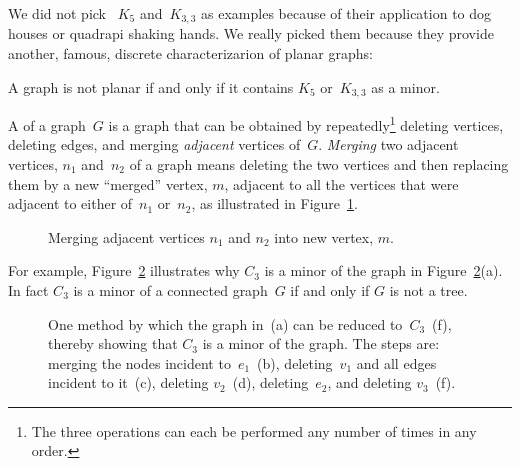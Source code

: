 We did not pick ~$K_5$ and~$K_{3, 3}$ as examples because of their
application to dog houses or quadrapi shaking hands.  We really picked
them because they provide another, famous, discrete characterizarion
of planar graphs:
\begin{theorem}[Kuratowski]\label{thm:kuratowski}
A graph is not planar if and only if it contains $K_5$ or~$K_{3, 3}$
as a minor.
\end{theorem}

\begin{definition}
  A  of a graph~$G$ is a graph that can be obtained by
  repeatedly\footnote{The three operations can each be performed any
    number of times in any order.} deleting vertices, deleting edges,
  and merging \emph{adjacent} vertices
  of~$G$.  \emph{Merging} two adjacent vertices, $n_1$ and~$n_2$ of a
  graph means deleting the two vertices and then replacing them by a
  new ``merged'' vertex, $m$, adjacent to all the vertices that were
  adjacent to either of~$n_1$ or~$n_2$, as illustrated in
  Figure~\ref{fig:merged}.
\end{definition}

\begin{figure}


\caption{Merging adjacent vertices $n_1$ and $n_2$ into new vertex, $m$.}
\label{fig:merged}
\end{figure}

For example, Figure~\ref{fig:5DL} illustrates why $C_3$ is a minor of
the graph in Figure~\ref{fig:5DL}(a).  In fact $C_3$ is a minor of a
connected graph~$G$ if and only if $G$ is not a tree.

\begin{figure}



\caption{One method by which the graph in~(a) can be reduced
  to~$C_3$~(f), thereby showing that $C_3$ is a minor of the graph.
  The steps are: merging the nodes incident to~$e_1$~(b),
  deleting~$v_1$ and all edges incident to it~(c), deleting $v_2$~(d),
deleting~$e_2$, and deleting $v_3$~(f).}

\label{fig:5DL}
\end{figure}


